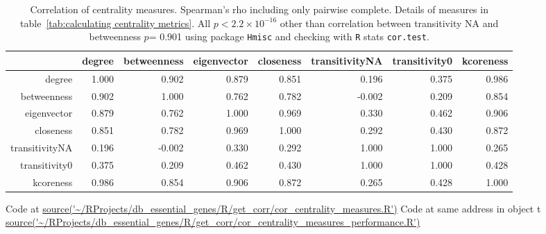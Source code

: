 \begin{table}[ht]
\centering
\setlength{\extrarowheight}{2pt}
\begin{adjustbox}{width=\textwidth}
\begin{tabular}{rrrrrrrr}
  \toprule
 & degree & betweenness & eigenvector & closeness & transitivityNA & transitivity0 & kcoreness \\ 
  \midrule
degree & 1.000 & 0.902 & 0.879 & 0.851 & 0.196 & 0.375 & 0.986 \\ 
  betweenness & 0.902 & 1.000 & 0.762 & 0.782 & -0.002 & 0.209 & 0.854 \\ 
  eigenvector & 0.879 & 0.762 & 1.000 & 0.969 & 0.330 & 0.462 & 0.906 \\ 
  closeness & 0.851 & 0.782 & 0.969 & 1.000 & 0.292 & 0.430 & 0.872 \\ 
  transitivityNA & 0.196 & -0.002 & 0.330 & 0.292 & 1.000 & 1.000 & 0.265 \\ 
  transitivity0 & 0.375 & 0.209 & 0.462 & 0.430 & 1.000 & 1.000 & 0.428 \\ 
  kcoreness & 0.986 & 0.854 & 0.906 & 0.872 & 0.265 & 0.428 & 1.000 \\ 
   \bottomrule
 
   
\end{tabular}
\end{adjustbox}
\caption[Correlation of centrality measures]{Correlation of centrality measures. Spearman's rho including only pairwise complete. Details of measures in table~\ref{tab:calculating centrality metrics}.  All $p<2.2 \times 10^{-16}$ other than correlation between transitivity NA and betweenness $p$= 0.901 using package \texttt{Hmisc} and checking with \texttt{R} stats \texttt{cor.test}. } 
\tiny Code at \url{source('~/RProjects/db_essential_genes/R/get_corr/cor_centrality_measures.R')}
\tiny Code at same address in object t \url{source('~/RProjects/db_essential_genes/R/get_corr/cor_centrality_measures_performance.R')}
\label{tab:Correlation of centrality measures 2 transitvities}
\end{table}

